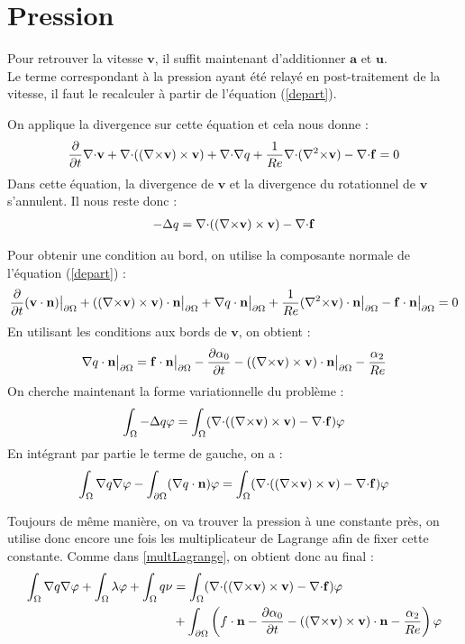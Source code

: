 \section{Pression}
\label{pression}
Pour retrouver la vitesse $\mathbf{v}$, il suffit maintenant d'additionner $\mathbf{a}$ et $\mathbf{u}$.\\
Le terme correspondant à la pression ayant été relayé en post-traitement de la vitesse, il faut le recalculer à partir de l'équation (\ref{depart}).

On applique la divergence sur cette équation et cela nous donne :
\[ \frac{\partial}{\partial t}{\nabla\cdot} \mathbf{v} + {\nabla\cdot}(({\nabla\times} \mathbf{v})\times \mathbf{v}) + {\nabla\cdot}{\nabla} q + \frac{1}{Re}{\nabla\cdot}({\nabla^2\times} \mathbf{v}) - {\nabla\cdot} \mathbf{f} = 0 \]
Dans cette équation, la divergence de $\mathbf{v}$ et la divergence du rotationnel de $\mathbf{v}$ s'annulent. Il nous reste donc :
\begin{eqnarray}\label{q}
-{\Delta} q = {\nabla\cdot}(({\nabla\times} \mathbf{v})\times \mathbf{v}) - {\nabla\cdot} \mathbf{f}
\end{eqnarray}

Pour obtenir une condition au bord, on utilise la composante normale de l'équation (\ref{depart}) :
\[ \frac{\partial}{\partial t}(\mathbf{v}\cdot \mathbf{n}){\big\rvert_{\partial\Omega}} + (({\nabla\times} \mathbf{v})\times \mathbf{v})\cdot \mathbf{n}{\big\rvert_{\partial\Omega}} + {\nabla} q\cdot \mathbf{n}{\big\rvert_{\partial\Omega}} +\frac{1}{Re}({\nabla^2\times} \mathbf{v})\cdot \mathbf{n}{\big\rvert_{\partial\Omega}} - \mathbf{f}\cdot \mathbf{n}{\big\rvert_{\partial\Omega}} = 0 \]
En utilisant les conditions aux bords de $\mathbf{v}$, on obtient :
\[ {\nabla} q\cdot \mathbf{n}{\big\rvert_{\partial\Omega}} =  \mathbf{f}\cdot \mathbf{n}{\big\rvert_{\partial\Omega}} - \frac{\partial\alpha_0}{\partial t} - (({\nabla\times} \mathbf{v})\times \mathbf{v})\cdot \mathbf{n}{\big\rvert_{\partial\Omega}} - \frac{\alpha_2}{Re} \]
On cherche maintenant la forme variationnelle du problème :
\[ \int_\Omega -{\Delta} q\varphi = \int_\Omega ({\nabla\cdot}(({\nabla\times} \mathbf{v})\times \mathbf{v}) -{\nabla\cdot} \mathbf{f})\varphi \]
En intégrant par partie le terme de gauche, on a :
\[ \int_\Omega {\nabla} q{\nabla}\varphi - \int_{\partial\Omega} ({\nabla} q\cdot \mathbf{n})\varphi = \int_\Omega ({\nabla\cdot}(({\nabla\times} \mathbf{v})\times \mathbf{v}) -{\nabla\cdot} \mathbf{f})\varphi \]

Toujours de même manière, on va trouver la pression à une constante près, on utilise donc encore une fois les multiplicateur de Lagrange afin de fixer cette constante. Comme dans \ref{multLagrange}, on obtient donc au final :
\begin{equation}\label{fvq}
\begin{aligned}
\int_\Omega {\nabla} q{\nabla}\varphi + \int_\Omega \lambda\varphi + \int_\Omega q\nu &= \int_\Omega ({\nabla\cdot}(({\nabla\times} \mathbf{v})\times \mathbf{v}) -{\nabla\cdot} \mathbf{f})\varphi\\
&+ \int_{\partial\Omega} \left(f\cdot \mathbf{n} - \frac{\partial\alpha_0}{\partial t} - (({\nabla\times} \mathbf{v})\times \mathbf{v})\cdot \mathbf{n} - \frac{\alpha_2}{Re}\right)\varphi
\end{aligned}
\end{equation}

